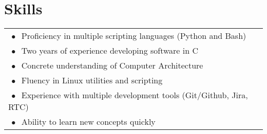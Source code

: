 \documentclass{article}
\begin{document}
\section{Skills}
\begin{tabular}{p{20cm} l}
    $\ \bullet \ $ Proficiency in multiple scripting languages (Python and Bash)
    \\

    $\ \bullet \ $ Two years of experience developing software in C
    \\

    $\ \bullet \ $ Concrete understanding of Computer Architecture
    \\

    $\ \bullet \ $ Fluency in Linux utilities and scripting
    \\

    $\ \bullet \ $ Experience with multiple development tools (Git/Github, Jira, RTC)
    \\

    $\ \bullet \ $ Ability to learn new concepts quickly
    \\

\end{tabular}
\end{document}
